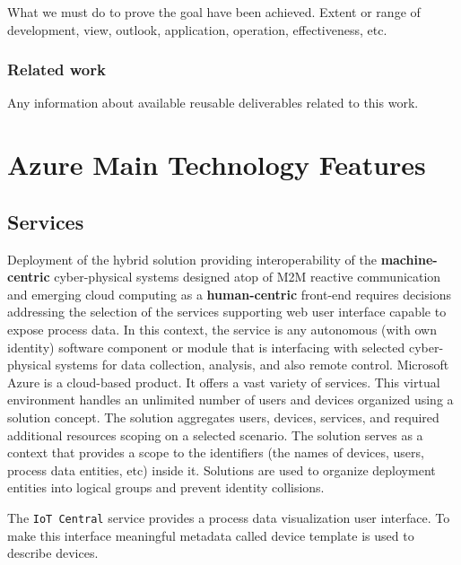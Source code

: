 \documentclass{jacsart}
\begin{document}
What we must do to prove the goal have been achieved. Extent or range of
development, view, outlook, application, operation, effectiveness, etc.

\hypertarget{related-work}{%
\subsubsection{Related work}\label{related-work}}

Any information about available reusable deliverables related to this
work.

\hypertarget{azure-main-technology-features}{%
\section{Azure Main Technology
Features}\label{azure-main-technology-features}}

\hypertarget{services}{%
\subsection{Services}\label{services}}

Deployment of the hybrid solution providing interoperability of the
\textbf{machine-centric} cyber-physical systems designed atop of M2M
reactive communication and emerging cloud computing as a
\textbf{human-centric} front-end requires decisions addressing the
selection of the services supporting web user interface capable to
expose process data. In this context, the service is any
autonomous (with own identity) software component or module that is
interfacing with selected cyber-physical systems for data collection,
analysis, and also remote control. Microsoft Azure is a cloud-based
product. It offers a vast variety of services. This virtual environment
handles an unlimited number of users and devices organized using a
solution concept. The solution aggregates users, devices, services, and
required additional resources scoping on a selected scenario. The
solution serves as a context that provides a scope to the identifiers
(the names of devices, users, process data entities, etc) inside it.
Solutions are used to organize deployment entities into logical groups
and prevent identity collisions.

The \texttt{IoT\ Central} service provides a process data visualization
user interface. To make this interface meaningful metadata called device
template is used to describe devices.
\end{document}
